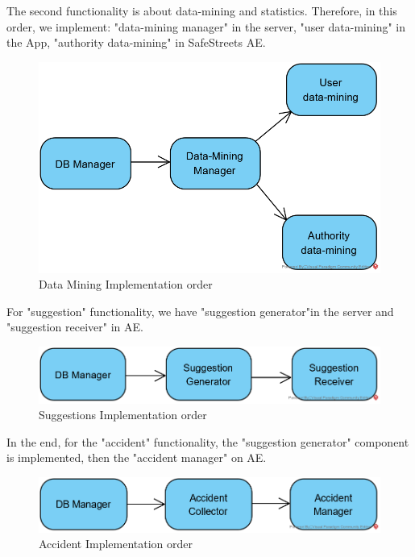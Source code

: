 \documentclass{article}
\begin{document}
		The second functionality is  about data-mining and statistics. Therefore, in this order, we implement: "data-mining manager" in the server, "user data-mining" in the App, "authority data-mining" in SafeStreets AE.\\
		\begin{figure}[H]
			\includegraphics [scale=0.9] {diagrams/datam_impltest.png}
			\caption[Data Mining Implementation order]{Data Mining Implementation order}
			\label{fig:datamining_order}
		\end{figure}
		For "suggestion" functionality, we have "suggestion generator"in the server and "suggestion receiver" in AE.\\
		\begin{figure}[H]
			\includegraphics [scale=0.9] {diagrams/suggestion_impltest.png}
			\caption[Suggestions Implementation order]{Suggestions Implementation order}
			\label{fig:suggestions_order}
		\end{figure}
		In the end, for the "accident" functionality, the "suggestion generator" component is implemented, then the "accident manager" on AE.\\
			\begin{figure}[H]
			\includegraphics [scale=0.9] {diagrams/accident_impltest.png}
			\caption[Accident Implementation order]{Accident Implementation order}
			\label{fig:accident_order}
		\end{figure}
\end{document}
